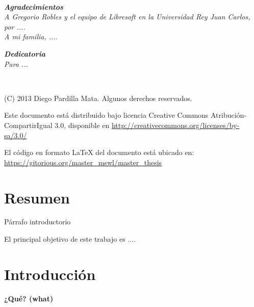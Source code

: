 \documentclass[a4paper, 12pt]{book}
\begin{document}
~
\newpage

\thispagestyle{empty}
\vspace{3cm}
\begin{flushright}
\textbf{\textit{Agradecimientos}} \\
\textit{A Gregorio Robles y el equipo de Libresoft en la Universidad
Rey Juan Carlos, \\
por ....  \\
A mi familia, ....}
\vspace{2cm}

\textbf{\textit{Dedicatoria}} \\
\textit{Para ...}
\end{flushright}
\newpage

~
\newpage

\thispagestyle{empty}
\vspace{12cm}
\begin{flushright}

(C) 2013 Diego Pardilla Mata. Algunos derechos reservados.

Este documento está distribuido bajo licencia Creative Commons 
Atribución-CompartirIgual 3.0,
disponible en \url{http://creativecommons.org/licenses/by-sa/3.0/}

El código en formato \LaTeX{} del documento está ubicado en:
\url{https://gitorious.org/master\_mswl/master\_thesis}
\end{flushright}

\tableofcontents

\listoffigures

\listoftables


\chapter*{Resumen}
\label{chap:resumen}
Párrafo introductorio

El principal objetivo de este trabajo es ....


\chapter{Introducción}
\label{chap:introduction}

\textbf{¿Qué? (what)}
\end{document}
